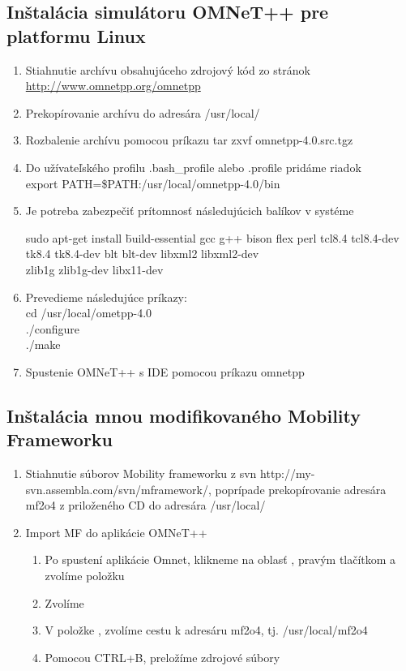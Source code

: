 \documentclass[11pt,twoside,a4paper]{book}
\begin{document}
\subsection{Inštalácia simulátoru OMNeT++ pre platformu Linux}
\begin{enumerate}
 \item Stiahnutie archívu obsahujúceho zdrojový kód zo stránok \\
 \url{http://www.omnetpp.org/omnetpp}
 \item Prekopírovanie archívu do adresára /usr/local/
 \item Rozbalenie archívu pomocou príkazu tar zxvf omnetpp-4.0.src.tgz
 \item Do užívateľského profilu .bash\_profile alebo .profile pridáme riadok \\
  export PATH=\$PATH:/usr/local/omnetpp-4.0/bin
  \item Je potreba zabezpečiť prítomnosť následujúcich balíkov v systéme 
    \begin{tabbing}
    sudo apt-get install \= build-essential gcc g++ bison flex perl tcl8.4 tcl8.4-dev \\
                       \> tk8.4 tk8.4-dev blt blt-dev libxml2 libxml2-dev \\
                       \> zlib1g zlib1g-dev libx11-dev
    \end{tabbing}    
 \item Prevedieme následujúce príkazy: \\
   cd /usr/local/ometpp-4.0 \\
   ./configure \\
   ./make
 \item Spustenie OMNeT++ s IDE pomocou príkazu omnetpp 
\end{enumerate}

\subsection{Inštalácia mnou modifikovaného Mobility Frameworku}
\begin{enumerate}
 \item Stiahnutie súborov Mobility frameworku z svn http://my-svn.assembla.com/svn/mframework/, poprípade prekopírovanie adresára mf2o4 z priloženého CD do adresára /usr/local/
 \item Import MF do aplikácie OMNeT++
  \begin{enumerate}
   \item Po spustení aplikácie Omnet, klikneme na oblasť , pravým tlačítkom a zvolíme položku 
   \item Zvolíme 
   \item V položke , zvolíme cestu k adresáru mf2o4, tj. /usr/local/mf2o4
   \item Pomocou CTRL+B, preložíme zdrojové súbory
  \end{enumerate}  
\end{enumerate}
\end{document}
